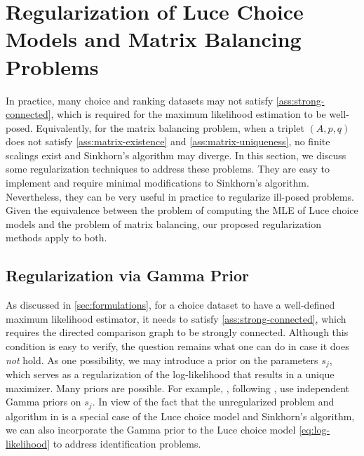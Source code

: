 \section{Regularization of Luce Choice Models and Matrix Balancing Problems}
\label{subsec:regularization}
In practice, many choice and ranking datasets may not satisfy \cref{ass:strong-connected}, which is required for the maximum likelihood estimation to be well-posed. Equivalently, for the matrix balancing problem, when a triplet $(A,p,q)$ does not satisfy \cref{ass:matrix-existence} and \cref{ass:matrix-uniqueness}, no finite scalings exist and Sinkhorn's algorithm may diverge. In this section, we discuss some regularization techniques to address these problems. They are easy to implement and require minimal modifications to Sinkhorn's algorithm. Nevertheless, they can be very useful in practice to regularize ill-posed problems. Given the equivalence between the problem of computing the MLE of Luce choice models and the problem of matrix balancing, our proposed regularization methods apply to both. 
\subsection{Regularization via Gamma Prior}
 As discussed in \cref{sec:formulations},  for a choice dataset to have a well-defined maximum likelihood estimator, it needs to satisfy \cref{ass:strong-connected}, which requires the directed comparison graph to be strongly connected. Although this condition is easy to verify, the question remains what one can do in case it does \emph{not} hold. As one possibility, we may introduce a prior on the parameters $s_j$, which serves as a regularization of the log-likelihood that results in a unique maximizer. Many priors are possible. For example, \citet{maystre2017choicerank}, following \citet{caron2012efficient}, use independent Gamma priors on $s_j$. In view of the fact that the unregularized problem and algorithm in \citet{maystre2017choicerank} is a special case of the Luce choice model and Sinkhorn's algorithm, we can also incorporate the Gamma prior to the Luce choice model \eqref{eq:log-likelihood} to address identification problems. 

